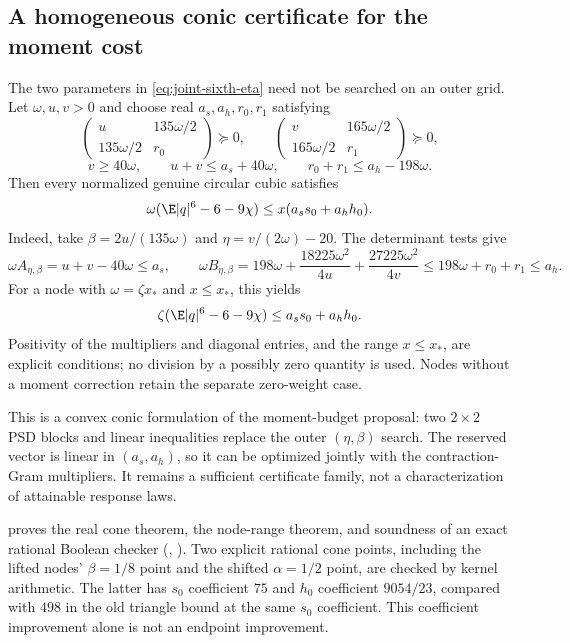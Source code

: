 \subsection{A homogeneous conic certificate for the moment cost}
\label{sec:moment-cost-cone}
The two parameters in \eqref{eq:joint-sixth-eta} need not be searched on an
outer grid. Let $\omega,u,v>0$ and choose real $a_s,a_h,r_0,r_1$ satisfying
\[
 \begin{pmatrix}u&135\omega/2\\135\omega/2&r_0\end{pmatrix}\succeq0,
 \qquad
 \begin{pmatrix}v&165\omega/2\\165\omega/2&r_1\end{pmatrix}\succeq0,
\]
\[
 v\ge40\omega,\qquad
 u+v\le a_s+40\omega,\qquad
 r_0+r_1\le a_h-198\omega.
\]
Then every normalized genuine circular cubic satisfies
\[
 \omega(\E|q|^6-6-9\chi)
 \le x(a_s s_0+a_h h_0).
\]
Indeed, take $\beta=2u/(135\omega)$ and
$\eta=v/(2\omega)-20$. The determinant tests give
\[
 \omega A_{\eta,\beta}=u+v-40\omega\le a_s,
 \qquad
 \omega B_{\eta,\beta}
 =198\omega+\frac{18225\omega^2}{4u}
                +\frac{27225\omega^2}{4v}
 \le198\omega+r_0+r_1\le a_h.
\]
For a node with $\omega=\zeta x_*$ and $x\le x_*$, this yields
\[
 \zeta(\E|q|^6-6-9\chi)\le a_s s_0+a_h h_0.
\]
Positivity of the multipliers and diagonal entries, and the range $x\le x_*$,
are explicit conditions; no division by a possibly zero quantity is used.
Nodes without a moment correction retain the separate zero-weight case.

This is a convex conic formulation of the moment-budget proposal: two
$2\times2$ PSD blocks and linear inequalities replace the outer
$(\eta,\beta)$ search. The reserved vector is linear in $(a_s,a_h)$, so it
can be optimized jointly with the contraction-Gram multipliers. It remains a
sufficient certificate family, not a characterization of attainable response laws.

 proves the real cone theorem,
the node-range theorem, and soundness of an exact rational Boolean checker
(, ). Two explicit rational
cone points, including the lifted nodes' $\beta=1/8$ point and the shifted
$\alpha=1/2$ point, are checked by kernel arithmetic. The latter has
$s_0$ coefficient $75$ and $h_0$ coefficient $9054/23$, compared with $498$
in the old triangle bound at the same $s_0$ coefficient. This coefficient
improvement alone is not an endpoint improvement.


